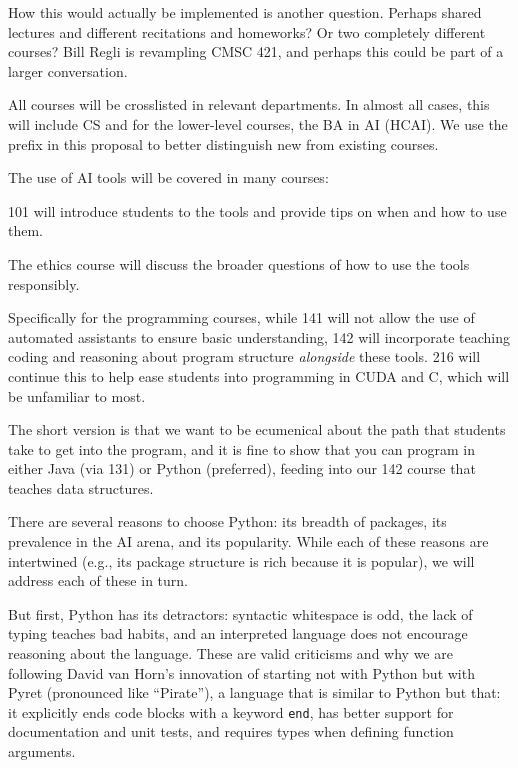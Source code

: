 How this would actually be implemented is another question.  Perhaps shared lectures and different recitations and homeworks?  Or two completely different courses?  Bill Regli is revampling CMSC 421, and perhaps this could be part of a larger conversation.


All courses will be crosslisted in relevant departments.  In almost all cases, this will include CS and for the lower-level courses, the BA in AI (HCAI).  We use the \prefix{} prefix in this proposal to better distinguish new from existing courses.


The use of AI tools will be covered in many courses:
\begin{itemize*}
    \item \prefix{} 101 will introduce students to the tools and provide tips on when and how to use them.
    \item The ethics course will discuss the broader questions of how to use the tools responsibly.
    \item Specifically for the programming courses, while \prefix{} 141 will not allow the use of automated assistants to ensure basic understanding, \prefix{} 142 will incorporate teaching coding and reasoning about program structure \emph{alongside} these tools.  \prefix{} 216 will continue this to help ease students into programming in CUDA and C, which will be unfamiliar to most.
\end{itemize*}


The short version is that we want to be ecumenical about the path that students take to get into the program, and it is fine to show that you can program in either Java (via 131) or Python (preferred), feeding into our 142 course that teaches data structures.

There are several reasons to choose Python: its breadth of packages, its prevalence in the AI arena, and its popularity.  While each of these reasons are intertwined (e.g., its package structure is rich because it is popular), we will address each of these in turn.

But first, Python has its detractors: syntactic whitespace is odd, the lack of typing teaches bad habits, and an interpreted language does not encourage reasoning about the language.  These are valid criticisms and why we are following David van Horn's innovation of starting not with Python but with Pyret (pronounced like ``Pirate''), a language that is similar to Python but that: it explicitly ends code blocks with a keyword \texttt{end}, has better support for documentation and unit tests, and requires types when defining function arguments.

